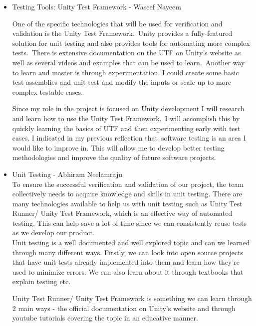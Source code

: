 \documentclass[12pt, titlepage]{article}
\begin{document}
\begin{itemize}
	\item Testing Tools: Unity Test Framework - Waseef Nayeem
	
	One of the specific technologies that will be used for verification and validation is the Unity Test Framework.\
	Unity provides a fully-featured solution for unit testing and also provides tools for automating more complex tests.\
	There is extensive documentation on the UTF on Unity's website as well as several videos and examples that can be used to learn.\
	Another way to learn and master is through experimentation. I could create some basic test assemblies and unit test and modify the inputs or scale up to more complex testable cases.

	Since my role in the project is focused on Unity development I will research and learn how to use the Unity Test Framework.\
	I will accomplish this by quickly learning the basics of UTF and then experimenting early with test cases. I indicated in my previous reflection that\
	software testing is an area I would like to improve in. This will allow me to develop better testing methodologies and improve the quality of future software projects.

\end{itemize}

\begin{itemize}

	\item Unit Testing - Abhiram Neelamraju \\
  
	To ensure the successful verification and validation of our project, the team collectively needs to acquire knowledge and skills in unit testing.
	There are many technologies available to help us with unit testing such as Unity Test Runner/ Unity Test Framework, which is an effective way of automated testing.
	This can help save a lot of time since we can consistently reuse tests as we develop our product. \\
	
	Unit testing is a well documented and well explored topic and can we learned through many different ways. Firstly, we can look into open source projects that have unit tests already implemented into them and learn how they're used to minimize errors. We can also learn about it through textbooks that explain testing etc.\
	
	Unity Test Runner/ Unity Test Framework is something we can learn through 2 main ways - the official documentation on Unity's website and through youtube tutorials covering the topic in an educative manner.

\end{itemize}
\end{document}

